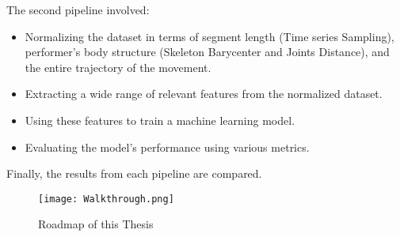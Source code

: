 The second pipeline involved:
\begin{itemize}
    \item Normalizing the dataset in terms of segment length (Time series Sampling), performer's body structure (Skeleton Barycenter and Joints Distance), and the entire trajectory of the movement.
    \item Extracting a wide range of relevant features from the normalized dataset.
    \item Using these features to train a machine learning model.
    \item Evaluating the model's performance using various metrics.
\end{itemize}
Finally, the results from each pipeline are compared.

\clearpage
\begin{figure}[H]
    \centering
    \texttt{[image: Walkthrough.png]}
    \caption{Roadmap of this Thesis}
    \label{fig:walktrough}
\end{figure}